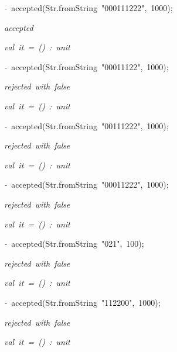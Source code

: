 \begin{list}{}
\item[]\textsl{-\ }accepted(Str.fromString\ "000111222",\ 1000);
\item[]\textsl{accepted}
\item[]\textsl{val\ it\ =\ ()\ :\ unit}
\item[]\textsl{-\ }accepted(Str.fromString\ "00011122",\ 1000);
\item[]\textsl{rejected\ with\ false}
\item[]\textsl{val\ it\ =\ ()\ :\ unit}
\item[]\textsl{-\ }accepted(Str.fromString\ "00111222",\ 1000);
\item[]\textsl{rejected\ with\ false}
\item[]\textsl{val\ it\ =\ ()\ :\ unit}
\item[]\textsl{-\ }accepted(Str.fromString\ "00011222",\ 1000);
\item[]\textsl{rejected\ with\ false}
\item[]\textsl{val\ it\ =\ ()\ :\ unit}
\item[]\textsl{-\ }accepted(Str.fromString\ "021",\ 100);
\item[]\textsl{rejected\ with\ false}
\item[]\textsl{val\ it\ =\ ()\ :\ unit}
\item[]\textsl{-\ }accepted(Str.fromString\ "112200",\ 1000);
\item[]\textsl{rejected\ with\ false}
\item[]\textsl{val\ it\ =\ ()\ :\ unit}
\end{list}
